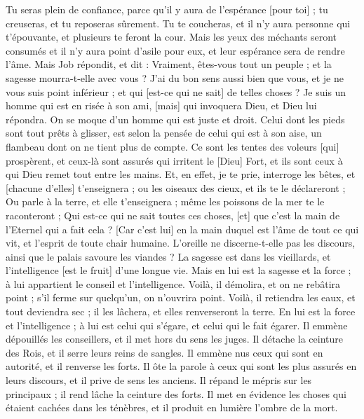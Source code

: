 \begin{multicols}{2}
Tu seras plein de confiance, parce qu'il y aura de l'espérance [pour toi] ; tu creuseras, et tu reposeras sûrement.
Tu te coucheras, et il n'y aura personne qui t'épouvante, et plusieurs te feront la cour.
Mais les yeux des méchants seront consumés et il n'y aura point d'asile pour eux, et leur espérance sera de rendre l'âme.
\VerseOne{}Mais Job répondit, et dit :
Vraiment, êtes-vous tout un peuple ; et la sagesse mourra-t-elle avec vous ?
J'ai du bon sens aussi bien que vous, et je ne vous suis point inférieur ; et qui [est-ce qui ne sait] de telles choses ?
Je suis un homme qui est en risée à son ami, [mais] qui invoquera Dieu, et Dieu lui répondra. On se moque d'un homme qui est juste et droit.
Celui dont les pieds sont tout prêts à glisser, est selon la pensée de celui qui est à son aise, un flambeau dont on ne tient plus de compte.
Ce sont les tentes des voleurs [qui] prospèrent, et ceux-là sont assurés qui irritent le [Dieu] Fort, et ils sont ceux à qui Dieu remet tout entre les mains.
Et, en effet, je te prie, interroge les bêtes, et [chacune d'elles] t'enseignera ; ou les oiseaux des cieux, et ils te le déclareront ;
Ou parle à la terre, et elle t'enseignera ; même les poissons de la mer te le raconteront ;
Qui est-ce qui ne sait toutes ces choses, [et] que c'est la main de l'Eternel qui a fait cela ?
[Car c'est lui] en la main duquel est l'âme de tout ce qui vit, et l'esprit de toute chair humaine.
L'oreille ne discerne-t-elle pas les discours, ainsi que le palais savoure les viandes ?
La sagesse est dans les vieillards, et l'intelligence [est le fruit] d'une longue vie.
Mais en lui est la sagesse et la force ; à lui appartient le conseil et l'intelligence.
Voilà, il démolira, et on ne rebâtira point ; s'il ferme sur quelqu'un, on n'ouvrira point.
Voilà, il retiendra les eaux, et tout deviendra sec ; il les lâchera, et elles renverseront la terre.
En lui est la force et l'intelligence ; à lui est celui qui s'égare, et celui qui le fait égarer.
Il emmène dépouillés les conseillers, et il met hors du sens les juges.
Il détache la ceinture des Rois, et il serre leurs reins de sangles.
Il emmène nus ceux qui sont en autorité, et il renverse les forts.
Il ôte la parole à ceux qui sont les plus assurés en leurs discours, et il prive de sens les anciens.
Il répand le mépris sur les principaux ; il rend lâche la ceinture des forts.
Il met en évidence les choses qui étaient cachées dans les ténèbres, et il produit en lumière l'ombre de la mort.

\end{multicols}
